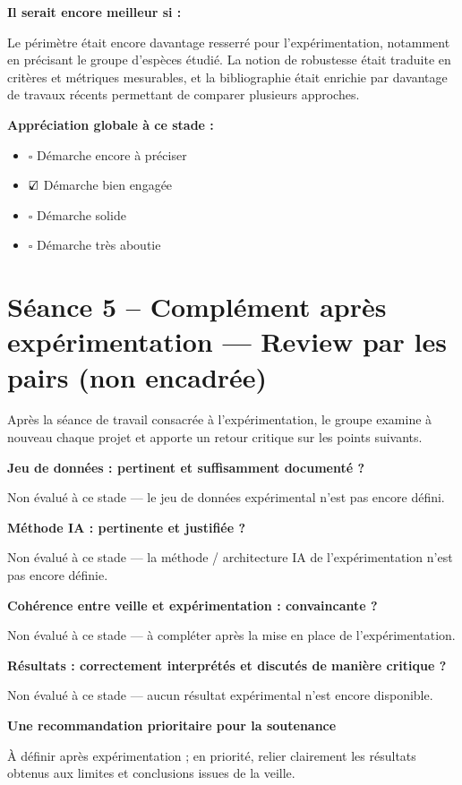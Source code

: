 \documentclass[11pt,a4paper]{article}
\newcommand{\checkbox}{\ensuremath{\square}}
\newcommand{\checkedbox}{\ensuremath{\rlap{\checkmark}\square}}
\newcommand{\reviewquestion}[1]{\textbf{#1}\par}
\begin{document}
\textbf{Il serait encore meilleur si :}

Le périmètre était encore davantage resserré pour l'expérimentation, notamment en précisant le groupe d'espèces étudié. La notion de robustesse était traduite en critères et métriques mesurables, et la bibliographie était enrichie par davantage de travaux récents permettant de comparer plusieurs approches.

\textbf{Appréciation globale à ce stade :}
\begin{itemize}[label={},leftmargin=0pt]
    \item \checkbox{} Démarche encore à préciser
    \item \checkedbox{} Démarche bien engagée
    \item \checkbox{} Démarche solide
    \item \checkbox{} Démarche très aboutie
\end{itemize}

\section*{Séance 5 -- Complément après expérimentation --- Review par les pairs (non encadrée)}

Après la séance de travail consacrée à l'expérimentation, le groupe examine à nouveau chaque projet et apporte un retour critique sur les points suivants.

\reviewquestion{Jeu de données : pertinent et suffisamment documenté ?}
Non évalué à ce stade --- le jeu de données expérimental n'est pas encore défini.

\reviewquestion{Méthode IA : pertinente et justifiée ?}
Non évalué à ce stade --- la méthode / architecture IA de l'expérimentation n'est pas encore définie.

\reviewquestion{Cohérence entre veille et expérimentation : convaincante ?}
Non évalué à ce stade --- à compléter après la mise en place de l'expérimentation.

\reviewquestion{Résultats : correctement interprétés et discutés de manière critique ?}
Non évalué à ce stade --- aucun résultat expérimental n'est encore disponible.

\reviewquestion{Une recommandation prioritaire pour la soutenance}
À définir après expérimentation ; en priorité, relier clairement les résultats obtenus aux limites et conclusions issues de la veille.
\end{document}
